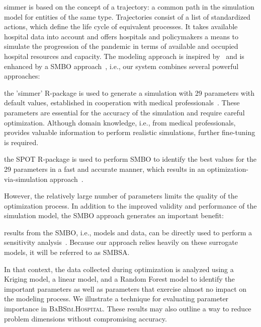 \documentclass[conference]{IEEEtran}
\newcommand{\babsimhospital}{\textsc{BaBSim.Hospital}\xspace}
\renewenvironment{description}[0]{\begin{compactdesc}}{\end{compactdesc}}
\begin{document}
\gls{simmer} is based on the concept of a trajectory: a common path in the simulation model for entities of the same type.
Trajectories consist of a list of standardized actions, which define the life cycle of equivalent processes. 
It takes available hospital data into account and offers hospitals and policymakers a means to simulate the progression of the pandemic in terms of available and occupied hospital resources and capacity. 
The modeling approach is inspired by~\citet{Lawt19a} and is enhanced by a  \gls{SMBO} approach~\citep{Forr08a}, i.e., our system 
combines several powerful approaches: 
\begin{description}
    \item[Discrete event simulation:] the 'simmer' R-package is used to generate a simulation with 29 parameters with default values, established in cooperation with medical professionals~\citep{Ucar19a}. These parameters are essential for the accuracy of the simulation and require careful optimization. Although domain knowledge, i.e., from medical professionals, provides valuable information to perform realistic simulations, further fine-tuning is required.
    \item [Model-based optimization:] the  \gls{SPOT} R-package is used to perform  \gls{SMBO} to identify the best values for the 29 parameters in a fast and accurate manner, which results in an optimization-via-simulation approach~\cite{Fu94a}.
\end{description}
However, the relatively large number of parameters limits the quality of the optimization process. 
In addition to the improved validity and performance of the simulation model, the \gls{SMBO} approach generates an important benefit: 
\begin{description}
\item[Sensitivity analysis:] results from the  \gls{SMBO}, i.e., models and data, can be directly used to perform a sensitivity analysis~\citep{Salt08b}.
Because our approach relies heavily on these surrogate models, it will be referred to as \gls{SMBSA}.
\end{description}
In that context, the data collected during optimization is analyzed using a Kriging model, a linear model, and a Random Forest model to identify the important parameters as well as parameters that exercise almost no impact on the modeling process. 
We illustrate a technique for evaluating parameter importance in \babsimhospital.
These results may also outline a way to reduce problem dimensions without compromising accuracy.
\end{document}
